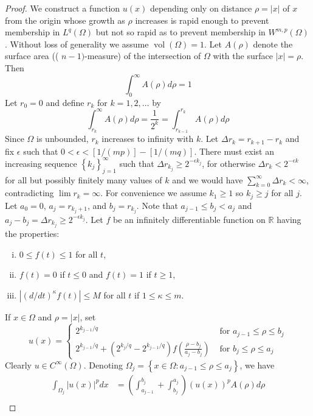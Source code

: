 \begin{proof}
  We construct a function $u(x)$ depending only on distance $\rho=|x|$ of $x$ from the origin whose growth as $\rho$ increases is rapid enough to prevent membership in $L^q(\Omega)$ but not so rapid as to prevent membership in $W^{m, p}(\Omega)$.
  Without loss of generality we assume $\operatorname{vol}(\Omega)=1$. Let $A(\rho)$ denote the surface area (( $n-1)$-measure) of the intersection of $\Omega$ with the surface $|x|=\rho$. Then
  \[
  \int_0^{\infty} A(\rho) d \rho=1
  \]
  Let $r_0=0$ and define $r_k$ for $k=1,2, \ldots$ by
  \[
  \int_{r_k}^{\infty} A(\rho) d \rho=\frac{1}{2^k}=\int_{r_{k-1}}^{r_k} A(\rho) d \rho
  \]
  Since $\Omega$ is unbounded, $r_k$ increases to infinity with $k$. Let $\Delta r_k=r_{k+1}-r_k$ and fix $\epsilon$ such that $0<\epsilon<[1 /(m p)]-[1 /(m q)]$. There must exist an increasing sequence $\left\{k_j\right\}_{j=1}^{\infty}$ such that $\Delta r_{k_j} \geq 2^{-\epsilon k_j}$, for otherwise $\Delta r_k<2^{-\epsilon k}$ for all but possibly finitely many values of $k$ and we would have $\sum_{k=0}^{\infty} \Delta r_k<\infty$, contradicting $\lim r_k=\infty$. For convenience we assume $k_1 \geq 1$ so $k_j \geq j$ for all $j$. Let $a_0=0$, $a_j=r_{k_j+1}$, and $b_j=r_{k_j}$. Note that $a_{j-1} \leq b_j<a_j$ and $a_j-b_j=\Delta r_{k_j} \geq 2^{-\epsilon k_j}$.
  Let $f$ be an infinitely differentiable function on $\mathbb{R}$ having the properties:
  \begin{enumerate}[(i)]
    \item $0 \leq f(t) \leq 1$ for all $t$,
    \item $f(t)=0$ if $t \leq 0$ and $f(t)=1$ if $t \geq 1$,
    \item $\left|(d / d t)^\kappa f(t)\right| \leq M$ for all $t$ if $1 \leq \kappa \leq m$.
  \end{enumerate}
  If $x \in \Omega$ and $\rho=|x|$, set
  \[
  u(x)= \begin{cases}2^{k_{j-1} / q} & \text { for } a_{j-1} \leq \rho \leq b_j \\ 2^{k_{j-1} / q}+\left(2^{k_j / q}-2^{k_{j-1} / q}\right) f\left(\frac{\rho-b_j}{a_j-b_j}\right) & \text { for } b_j \leq \rho \leq a_j\end{cases}
  \]
  Clearly $u \in C^{\infty}(\Omega)$. Denoting $\Omega_j=\left\{x \in \Omega: a_{j-1} \leq \rho \leq a_j\right\}$, we have
  \[
  \begin{aligned}
  \int_{\Omega_j}|u(x)|^p d x & =\left(\int_{a_{j-1}}^{b_j}+\int_{b_j}^{a_j}\right)(u(x))^p A(\rho) d \rho \\

\end{aligned}\]
\end{proof}
